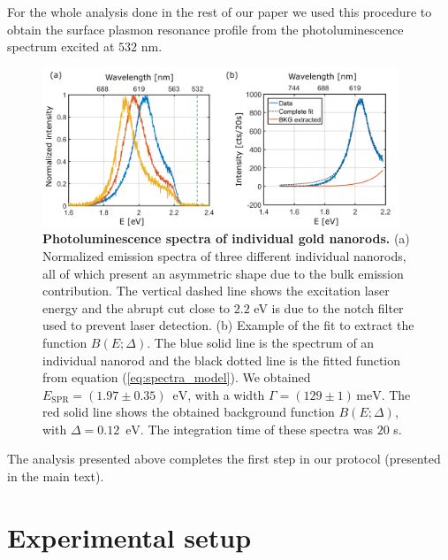 \documentclass[journal=nalefd,manuscript=letter]{achemso}
\newcommand{\nm}{\ensuremath{\,\textrm{nm}}}
\newcommand{\eV}{\ensuremath{\,\textrm{eV}}}
\newcommand{\meV}{\ensuremath{\,\textrm{meV}}}
\begin{document}
For the whole analysis done in the rest of our paper we used this procedure to obtain the
surface plasmon resonance profile from the photoluminescence spectrum excited at $532$ nm.

\begin{figure}[htp] \centering
\includegraphics[width=0.95\textwidth]{Figures/Supplementary/09_Error_vs_Wavelength/532nm_spectra_and_bkg.png}
\caption{\textbf{Photoluminescence spectra of individual gold nanorods.} 
(a) Normalized emission spectra of three different individual nanorods, all of which present 
an asymmetric shape due to the bulk emission contribution. The vertical dashed line shows the 
excitation laser energy and the abrupt cut close to $2.2$ eV is due to the notch filter used 
to prevent laser detection. (b) Example of the fit to extract the function $B(E;\Delta)$. 
The blue solid line is the spectrum of an individual nanorod and the black dotted line is the 
fitted function from equation (\ref{eq:spectra_model}). We obtained $E_\textrm{SPR}=(1.97 \pm 0.35)$ \eV, 
with a width $\Gamma=(129 \pm 1) \meV$.
The red solid line shows the obtained background function $B(E;\Delta)$, with $\Delta = 0.12$ \eV. 
The integration time of these spectra was $20$ s.}
\label{fig:PL_spectra}
\end{figure}

The analysis presented above completes the  first step in our protocol 
(presented in the main text). 


\pagebreak
\section{Experimental setup}\label{sec:setup}
\end{document}
